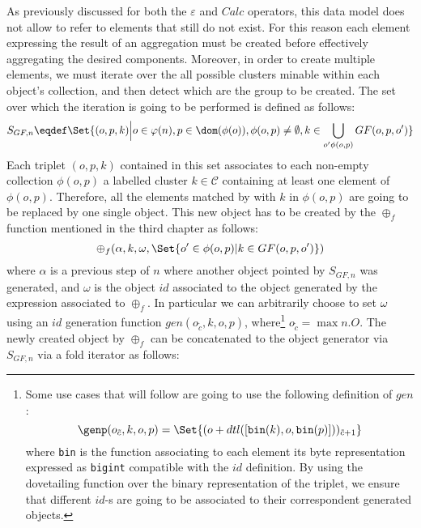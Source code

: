 As previously discussed for both the $\varepsilon$ and $Calc$ operators, this data model does not allow to refer to elements that still do not exist. For this reason each element expressing the result of an aggregation must be created before effectively aggregating the desired components. Moreover, in order to create multiple elements, we must  iterate over the all possible clusters minable within each object's collection, and then detect which are the group to be created. The set over which the iteration is going to be performed is defined as follows:
\[S_{GF,n}\eqdef\Set{(o,p,k)\Big|o\in \varphi(n),p\in\dom(\phi(o)),\phi(o,p)\neq\emptyset, k\in\bigcup_{o'\phi(o,p)} GF(o,p,o')}\]
Each triplet $(o,p,k)$ contained in this set associates to each non-empty collection $\phi(o,p)$ a labelled cluster $k\in\mathcal{C}$ containing at least one element of $\phi(o,p)$. Therefore, all the elements matched by with $k$ in $\phi(o,p)$ are going to be replaced by one single object. This new object has to be created by the $\oplus_f$ function mentioned in the third chapter as follows: 
\[\oplus_f(\alpha,k,\omega,\Set{o'\in\phi(o,p)|k\in GF(o,p,o')})\]
where $\alpha$ is a previous step of $n$ where another object pointed by $S_{GF,n}$ was generated, and $\omega$ is the object $id$ associated to the object generated by the expression associated to $\oplus_f$. In particular we can arbitrarily choose to set $\omega$ using an $id$ generation function $gen(o_{\tilde{c}},k,o,p)$, where\footnote{Some use cases that will follow are going to use the following definition of $gen$: \[\genp(o_{\tilde{c}},k,o,p)=\Set{(o+dtl([\texttt{bin}(k),o,\texttt{bin}(p)]))_{\tilde{c}+1}}\] where \texttt{bin} is the function associating to each element its byte representation expressed as \texttt{bigint} compatible with the $id$ definition. By using the dovetailing function over the binary representation of the triplet, we ensure that different $id$-s are going to be associated to their correspondent generated objects.} $o_{\tilde{c}} = \max n.O$. The newly created object by $\oplus_f$  can be concatenated to the object generator via $S_{GF,n}$ via a fold iterator as follows:

